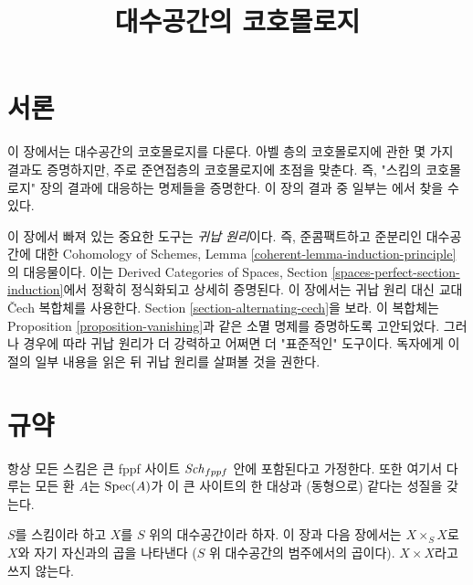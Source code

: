 

%


\title{대수공간의 코호몰로지}

\maketitle

\label{section-phantom}

\tableofcontents




\section{서론}
\label{section-introduction}

\noindent
이 장에서는 대수공간의 코호몰로지를 다룬다.
아벨 층의 코호몰로지에 관한 몇 가지 결과도 증명하지만,
주로 준연접층의 코호몰로지에 초점을 맞춘다. 즉,
"스킴의 코호몰로지" 장의 결과에 대응하는 명제들을 증명한다.
이 장의 결과 중 일부는 \cite{Kn}에서 찾을 수 있다.

\medskip\noindent
이 장에서 빠져 있는 중요한 도구는 {\it 귀납 원리}이다. 즉,
준콤팩트하고 준분리인 대수공간에 대한
Cohomology of Schemes, Lemma
\ref{coherent-lemma-induction-principle}의 대응물이다.
이는 Derived Categories of Spaces, Section
\ref{spaces-perfect-section-induction}에서 정확히 정식화되고
상세히 증명된다. 이 장에서는 귀납 원리 대신
교대 {\v C}ech 복합체를 사용한다.
Section \ref{section-alternating-cech}을 보라.
이 복합체는 Proposition \ref{proposition-vanishing}과 같은
소멸 명제를 증명하도록 고안되었다. 그러나 경우에 따라 귀납 원리가
더 강력하고 어쩌면 더 "표준적인" 도구이다.
독자에게 이 절의 일부 내용을 읽은 뒤 귀납 원리를 살펴볼 것을 권한다.



\section{규약}
\label{section-conventions}

\noindent
항상 모든 스킴은 큰 fppf 사이트 $\mathit{Sch}_{fppf}$ 안에 포함된다고 가정한다.
또한 여기서 다루는 모든 환 $A$는 $\mathop{\mathrm{Spec}}(A)$가 이 큰 사이트의
한 대상과 (동형으로) 같다는 성질을 갖는다.

\medskip\noindent
$S$를 스킴이라 하고 $X$를 $S$ 위의 대수공간이라 하자.
이 장과 다음 장에서는 $X \times_S X$로
$X$와 자기 자신과의 곱을 나타낸다
($S$ 위 대수공간의 범주에서의 곱이다).
$X \times X$라고 쓰지 않는다.







